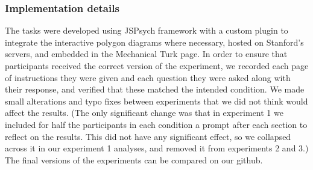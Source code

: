\documentclass[man,10pt]{apa6}
\begin{document}
\subsubsection{Implementation details}
The tasks were developed using JSPsych framework with a custom plugin to integrate the interactive polygon diagrams where necessary, hosted on Stanford's servers, and embedded in the Mechanical Turk page. In order to ensure that participants received the correct version of the experiment, we recorded each page of instructions they were given and each question they were asked along with their response, and verified that these matched the intended condition. We made small alterations and typo fixes between experiments that we did not think would affect the results. (The only significant change was that in experiment 1 we included for half the participants in each condition a prompt after each section to reflect on the results. This did not have any significant effect, so we collapsed across it in our experiment 1 analyses, and removed it from experiments 2 and 3.) The final versions of the experiments can be compared on our github.%
\end{document}
